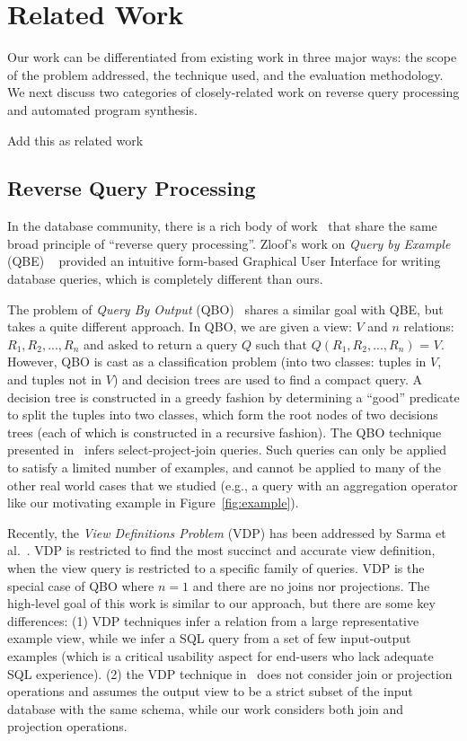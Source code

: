 
\section{Related Work}
\label{sec:related}

Our work can be differentiated from existing work in three major ways: the scope
of the problem addressed, the technique used, and the evaluation methodology.
We next discuss two categories of closely-related work on reverse query processing
and automated program synthesis.

Add this as related work~\cite{abs-1208-2013}

\subsection{Reverse Query Processing}

In the database community, there is a rich body of
work~\cite{Zloof:1975, Tran:2009, DasSarma:2010} that share the same broad principle
of ``reverse query processing''. Zloof's work on \textit{Query by Example} (QBE)
~\cite{Zloof:1975} provided an intuitive form-based Graphical User Interface for
writing database queries, which is completely different than ours.

The problem of \textit{Query By Output} (QBO)~\cite{Tran:2009} shares a similar
goal with QBE, but takes a quite different approach.
In QBO, we are given a view: $V$ and $n$ relations: $R_1, R_2, ..., R_n$ and asked to
return a query $Q$ such that $Q(R_1, R_2, ..., R_n)$ = $V$. However, QBO is cast as
a classification problem (into two classes: tuples in $V$, and tuples not in $V$)
and decision trees are used to find a compact query. A decision tree is constructed
in a greedy fashion by determining a ``good'' predicate to split the tuples into two
classes, which form the root nodes of two decisions trees (each of which is
constructed in a recursive fashion).  The QBO technique presented in~\cite{Tran:2009}
infers select-project-join queries. Such queries can only be applied to
satisfy a limited number of examples, and cannot be applied to many of the other
real world cases that we studied (e.g., a query with an aggregation operator
like our motivating example in Figure~\ref{fig:example}).

Recently, the \textit{View Definitions Problem} (VDP) has been addressed
by Sarma et al.~\cite{DasSarma:2010}.
VDP is restricted to find the most succinct and accurate view definition, when
the view query is restricted to a specific family of queries. VDP is the special
case of QBO where $n = 1$ and there are no joins nor projections.
The high-level goal of this work is similar to our approach, but there
are some key differences: (1) VDP techniques infer a relation from a large representative
example view, while we infer a SQL query from a set of few input-output examples
(which is a critical usability aspect for end-users who lack adequate
SQL experience). (2) the VDP technique in~\cite{DasSarma:2010} does
not consider join or projection
operations and assumes the output view to be a strict subset of the input
database with the same schema, while our work considers both join and
projection operations.


